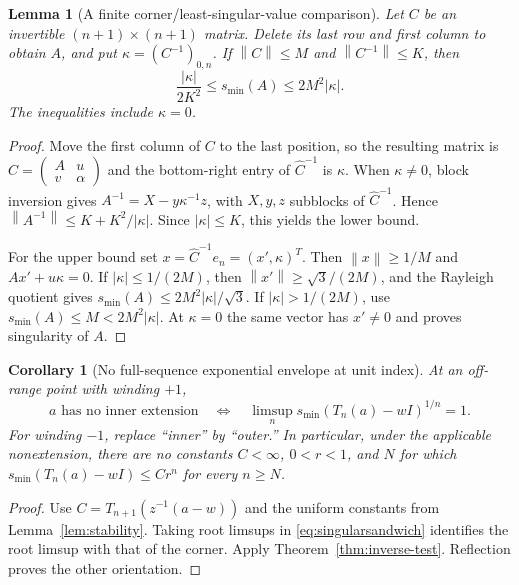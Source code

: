 \documentclass[11pt]{article}
\newtheorem{lemma}[theorem]{Lemma}
\newtheorem{corollary}[theorem]{Corollary}
\theoremstyle{definition}
\newcommand{\norm}[1]{\left\lVert #1\right\rVert}
\begin{document}
\begin{lemma}[A finite corner/least-singular-value comparison]\label{lem:comparison}
Let $C$ be an invertible $(n+1)\times(n+1)$ matrix. Delete its last row and first column to obtain $A$, and put $\kappa=(C^{-1})_{0,n}$. If $\norm C\le M$ and $\norm{C^{-1}}\le K$, then
\begin{equation}
 \frac{|\kappa|}{2K^2}\le s_{\min}(A)\le2M^2|\kappa|.
 \label{eq:singularsandwich}
\end{equation}
The inequalities include $\kappa=0$.
\end{lemma}
\begin{proof}
Move the first column of $C$ to the last position, so the resulting matrix is
$\widehat C=\begin{pmatrix}A&u\\v&\alpha\end{pmatrix}$ and the bottom-right entry of $\widehat C^{-1}$ is $\kappa$. When $\kappa\ne0$, block inversion gives
$A^{-1}=X-y\kappa^{-1}z$, with $X,y,z$ subblocks of $\widehat C^{-1}$. Hence
$\norm{A^{-1}}\le K+K^2/|\kappa|$. Since $|\kappa|\le K$, this yields the lower bound.

For the upper bound set $x=\widehat C^{-1}e_n=(x',\kappa)^T$. Then $\norm x\ge1/M$ and $Ax'+u\kappa=0$. If $|\kappa|\le1/(2M)$, then $\norm{x'}\ge\sqrt3/(2M)$, and the Rayleigh quotient gives $s_{\min}(A)\le2M^2|\kappa|/\sqrt3$. If $|\kappa|>1/(2M)$, use $s_{\min}(A)\le M<2M^2|\kappa|$. At $\kappa=0$ the same vector has $x'\ne0$ and proves singularity of $A$.
\end{proof}

\begin{corollary}[No full-sequence exponential envelope at unit index]\label{cor:smin}
At an off-range point with winding $+1$,
\begin{equation}
 a\text{ has no inner extension}
 \quad\Longleftrightarrow\quad
 \limsup_n s_{\min}(T_n(a)-wI)^{1/n}=1.
 \label{eq:svroot}
\end{equation}
For winding $-1$, replace ``inner'' by ``outer.'' In particular, under the applicable nonextension, there are no constants $C<\infty$, $0<r<1$, and $N$ for which
$s_{\min}(T_n(a)-wI)\le Cr^n$ for every $n\ge N$.
\end{corollary}
\begin{proof}
Use $C=T_{n+1}(z^{-1}(a-w))$ and the uniform constants from Lemma~\ref{lem:stability}. Taking root limsups in \eqref{eq:singularsandwich} identifies the root limsup with that of the corner. Apply Theorem~\ref{thm:inverse-test}. Reflection proves the other orientation.
\end{proof}
\end{document}

